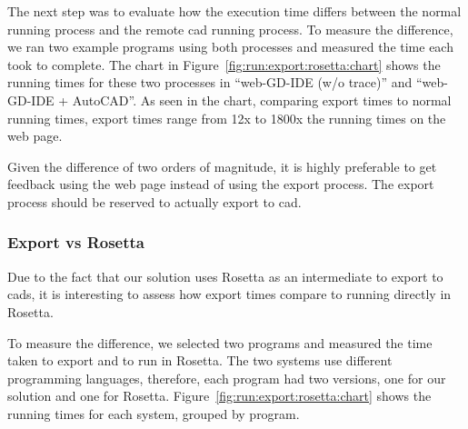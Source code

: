The next step was to evaluate how the execution time differs between the normal running process and the remote \gls{cad} running process.
To measure the difference, we ran two example programs using both processes and measured the time each took to complete.
The chart in Figure~\ref{fig:run:export:rosetta:chart} shows the running times for these two processes in ``web-GD-IDE (w/o trace)'' and ``web-GD-IDE + AutoCAD''.
As seen in the chart, comparing export times to normal running times, export times range from 12x to 1800x the running times on the web page.

Given the difference of two orders of magnitude, it is highly preferable to get feedback using the web page instead of using the export process.
The export process should be reserved to actually export to \gls{cad}.




\subsubsection{Export vs Rosetta}
Due to the fact that our solution uses Rosetta as an intermediate to export to \glspl{cad}, it is interesting to assess how export times compare to running directly in Rosetta.

To measure the difference, we selected two programs and measured the time taken to export and to run in Rosetta.
The two systems use different programming languages, therefore, each program had two versions, one for our solution and one for Rosetta.
Figure~\ref{fig:run:export:rosetta:chart} shows the running times for each system, grouped by program.

